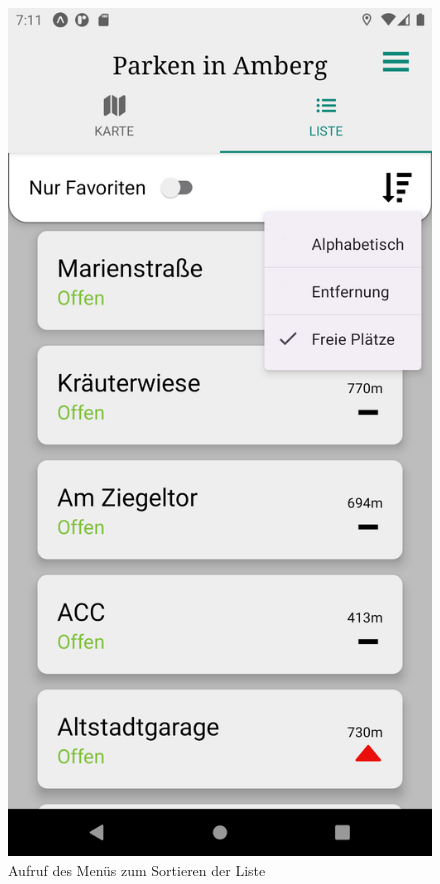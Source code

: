 \begin{figure}
	\vspace{-\baselineskip}
	\centering
	\includegraphics[scale=0.15]{img/sorting}
	\caption{Aufruf des Menüs zum Sortieren der Liste}
	\label{fig:sorting}
\end{figure}
